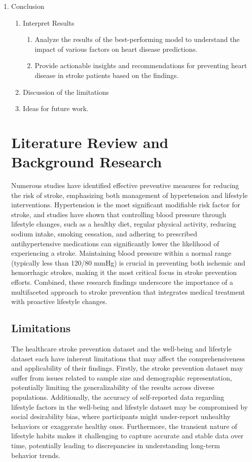 \documentclass[runningheads]{llncs}
\begin{document}
\begin{enumerate}
\item Conclusion
\begin{enumerate}
    \item Interpret Results
        \begin{enumerate}
            \item Analyze the results of the best-performing model to understand the impact of various factors on heart disease predictions. 
            \item Provide actionable insights and recommendations for preventing heart disease in stroke patients based on the findings. 
        \end{enumerate}
\item Discussion of the limitations
\item Ideas for future work.
\end{enumerate}

\section{Literature Review and Background Research}
Numerous studies have identified effective preventive measures for reducing the risk of stroke, emphasizing both management of hypertension and lifestyle interventions. \cite{sirisha2021awareness} Hypertension is the most significant modifiable risk factor for stroke, and studies have shown that controlling blood pressure through lifestyle changes, such as a healthy diet, regular physical activity, reducing sodium intake, smoking cessation, and adhering to prescribed antihypertensive medications can significantly lower the likelihood of experiencing a stroke. \cite{doi:10.1161/STR.0000000000000375} Maintaining blood pressure within a normal range (typically less than 120/80 mmHg) is crucial in preventing both ischemic and hemorrhagic strokes, making it the most critical focus in stroke prevention efforts. \cite{doi:10.1161/STR.0000000000000375} Combined, these research findings underscore the importance of a multifaceted approach to stroke prevention that integrates medical treatment with proactive lifestyle changes.

\subsection{Limitations}
The healthcare stroke prevention dataset and the well-being and lifestyle dataset each have inherent limitations that may affect the comprehensiveness and applicability of their findings. Firstly, the stroke prevention dataset may suffer from issues related to sample size and demographic representation, potentially limiting the generalizability of the results across diverse populations. Additionally, the accuracy of self-reported data regarding lifestyle factors in the well-being and lifestyle dataset may be compromised by social desirability bias, where participants might under-report unhealthy behaviors or exaggerate healthy ones. Furthermore, the transient nature of lifestyle habits makes it challenging to capture accurate and stable data over time, potentially leading to discrepancies in understanding long-term behavior trends.


\end{enumerate}
\end{document}
